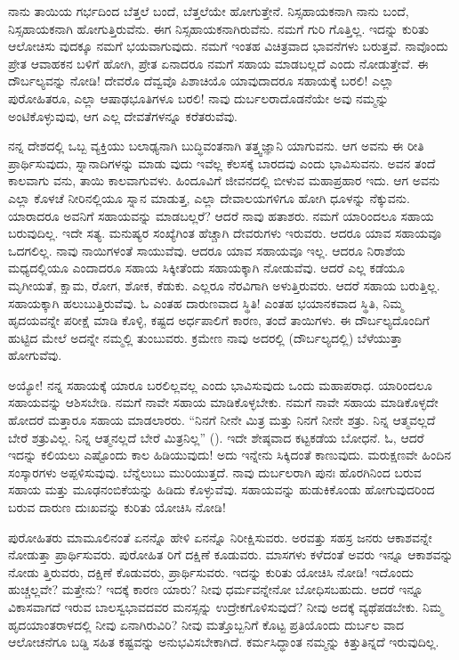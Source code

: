 ನಾನು ತಾಯಿಯ ಗರ್ಭದಿಂದ ಬೆತ್ತಲೆ ಬಂದೆ, ಬೆತ್ತಲೆಯೇ ಹೋಗುತ್ತೇನೆ. ನಿಸ್ಸಹಾಯಕನಾಗಿ ನಾನು ಬಂದೆ, ನಿಸ್ಸಹಾಯಕನಾಗಿ ಹೋಗುತ್ತಿರುವೆನು. ಈಗ ನಿಸ್ಸಹಾಯಕನಾಗಿರುವೆನು. ನಮಗೆ ಗುರಿ ಗೊತ್ತಿಲ್ಲ. ಇದನ್ನು ಕುರಿತು ಆಲೋಚಿಸು ವುದಕ್ಕೂ ನಮಗೆ ಭಯವಾಗುವುದು. ನಮಗೆ ಇಂತಹ ವಿಚಿತ್ರವಾದ ಭಾವನೆಗಳು ಬರುತ್ತವೆ. ನಾವೊಂದು ಪ್ರೇತ ಆವಾಹಕನ ಬಳಿಗೆ ಹೋಗಿ, ಪ್ರೇತ ಏನಾದರೂ ನಮಗೆ ಸಹಾಯ ಮಾಡಬಲ್ಲದೆ ಎಂದು ನೋಡುತ್ತೇವೆ. ಈ ದೌರ್ಬಲ್ಯವನ್ನು ನೋಡಿ! ದೇವರೊ ದೆವ್ವವೊ ಪಿಶಾಚಿಯೊ ಯಾವುದಾದರೂ ಸಹಾಯಕ್ಕೆ ಬರಲಿ! ಎಲ್ಲಾ ಪುರೋಹಿತರೂ, ಎಲ್ಲಾ ಆಷಾಢಭೂತಿಗಳೂ ಬರಲಿ! ನಾವು ದುರ್ಬಲರಾದೊಡನೆಯೇ ಅವು ನಮ್ಮನ್ನು ಅಂಟಿಕೊಳ್ಳುವುವು, ಆಗ ಎಲ್ಲ ದೇವತೆಗಳನ್ನೂ ಕರೆತರುವೆವು.

ನನ್ನ ದೇಶದಲ್ಲಿ ಒಬ್ಬ ವ್ಯಕ್ತಿಯು ಬಲಾಢ್ಯನಾಗಿ ಬುದ್ಧಿವಂತನಾಗಿ ತತ್ತ್ವಜ್ಞಾನಿ ಯಾಗುವನು. ಆಗ ಅವನು ಈ ರೀತಿ ಪ್ರಾರ್ಥಿಸುವುದು, ಸ್ನಾನಾದಿಗಳನ್ನು ಮಾಡು ವುದು ಇವೆಲ್ಲ ಕೆಲಸಕ್ಕೆ ಬಾರದವು ಎಂದು ಭಾವಿಸುವನು. ಅವನ ತಂದೆ ಕಾಲವಾಗು ವನು, ತಾಯಿ ಕಾಲವಾಗುವಳು. ಹಿಂದೂವಿಗೆ ಜೀವನದಲ್ಲಿ ಬೀಳುವ ಮಹಾಪ್ರಹಾರ ಇದು. ಆಗ ಅವನು ಎಲ್ಲಾ ಕೊಳಚೆ ನೀರಿನಲ್ಲಿಯೂ ಸ್ನಾನ ಮಾಡುತ್ತ, ಎಲ್ಲಾ ದೇವಾಲಯಗಳಿಗೂ ಹೋಗಿ ಧೂಳನ್ನು ನೆಕ್ಕುವನು. ಯಾರಾದರೂ ಅವನಿಗೆ ಸಹಾಯವನ್ನು ಮಾಡಬಲ್ಲರೆ? ಆದರೆ ನಾವು ಹತಾಶರು. ನಮಗೆ ಯಾರಿಂದಲೂ ಸಹಾಯ ಬರುವುದಿಲ್ಲ. ಇದೇ ಸತ್ಯ. ಮನುಷ್ಯರ ಸಂಖ್ಯೆಗಿಂತ ಹೆಚ್ಚಾಗಿ ದೇವರುಗಳು ಇರುವರು. ಆದರೂ ಯಾವ ಸಹಾಯವೂ ಒದಗಲಿಲ್ಲ. ನಾವು ನಾಯಿಗಳಂತೆ ಸಾಯುವೆವು. ಆದರೂ ಯಾವ ಸಹಾಯವೂ ಇಲ್ಲ. ಆದರೂ ನಿರಾಶೆಯ ಮಧ್ಯದಲ್ಲಿಯೂ ಎಂದಾದರೂ ಸಹಾಯ ಸಿಕ್ಕೀತೆಂದು ಸಹಾಯಕ್ಕಾಗಿ ನೋಡುವೆವು. ಆದರೆ ಎಲ್ಲ ಕಡೆಯೂ ಮೃಗೀಯತೆ, ಕ್ಷಾಮ, ರೋಗ, ಶೋಕ, ಕೆಡುಕು. ಎಲ್ಲರೂ ನೆರವಿಗಾಗಿ ಅಳುತ್ತಿರುವರು. ಆದರೆ ಸಹಾಯ ಬರುತ್ತಿಲ್ಲ. ಸಹಾಯಕ್ಕಾಗಿ ಹಲುಬುತ್ತಿರುವೆವು. ಓ ಎಂತಹ ದಾರುಣವಾದ ಸ್ಥಿತಿ! ಎಂತಹ ಭಯಾನಕವಾದ ಸ್ಥಿತಿ, ನಿಮ್ಮ ಹೃದಯವನ್ನೇ ಪರೀಕ್ಷೆ ಮಾಡಿ ಕೊಳ್ಳಿ, ಕಷ್ಟದ ಅರ್ಧಪಾಲಿಗೆ ಕಾರಣ, ತಂದೆ ತಾಯಿಗಳು. ಈ ದೌರ್ಬಲ್ಯದೊಂದಿಗೆ ಹುಟ್ಟಿದ ಮೇಲೆ ಅದನ್ನೇ ನಮ್ಮಲ್ಲಿ ತುಂಬುವರು. ಕ್ರಮೇಣ ನಾವು ಅದರಲ್ಲಿ (ದೌರ್ಬಲ್ಯದಲ್ಲಿ) ಬೆಳೆಯುತ್ತಾ ಹೋಗುವೆವು.

ಅಯ್ಯೋ! ನನ್ನ ಸಹಾಯಕ್ಕೆ ಯಾರೂ ಬರಲಿಲ್ಲವಲ್ಲ ಎಂದು ಭಾವಿಸುವುದು ಒಂದು ಮಹಾಪರಾಧ. ಯಾರಿಂದಲೂ ಸಹಾಯವನ್ನು ಆಶಿಸಬೇಡಿ. ನಮಗೆ ನಾವೇ ಸಹಾಯ ಮಾಡಿಕೊಳ್ಳಬೇಕು. ನಮಗೆ ನಾವೇ ಸಹಾಯ ಮಾಡಿಕೊಳ್ಳದೇ ಹೋದರೆ ಮತ್ತಾರೂ ಸಹಾಯ ಮಾಡಲಾರರು. “ನಿನಗೆ ನೀನೇ ಮಿತ್ರ ಮತ್ತು ನಿನಗೆ ನೀನೇ ಶತ್ರು. ನಿನ್ನ ಆತ್ಮವಲ್ಲದೆ ಬೇರೆ ಶತ್ರುವಿಲ್ಲ. ನಿನ್ನ ಆತ್ಮನಲ್ಲದೆ ಬೇರೆ ಮಿತ್ರನಿಲ್ಲ” (). ಇದೇ ಶೇಷ್ಠವಾದ ಕಟ್ಟಕಡೆಯ ಬೋಧನೆ. ಓ, ಆದರೆ ಇದನ್ನು ಕಲಿಯಲು ಎಷ್ಟೊಂದು ಕಾಲ ಹಿಡಿಯುವುದು! ಅದು ಇನ್ನೇನು ಸಿಕ್ಕಿದಂತೆ ಕಾಣುವುದು. ಮರುಕ್ಷಣವೇ ಹಿಂದಿನ ಸಂಸ್ಕಾರಗಳು ಅಪ್ಪಳಿಸುವುವು. ಬೆನ್ನೆಲುಬು ಮುರಿಯುತ್ತದೆ. ನಾವು ದುರ್ಬಲರಾಗಿ ಪುನಃ ಹೊರಗಿನಿಂದ ಬರುವ ಸಹಾಯ ಮತ್ತು ಮೂಢನಂಬಿಕೆಯನ್ನು ಹಿಡಿದು ಕೊಳ್ಳುವೆವು. ಸಹಾಯವನ್ನು ಹುಡುಕಿಕೊಂಡು ಹೋಗುವುದರಿಂದ ಬರುವ ದಾರುಣ ದುಃಖವನ್ನು ಕುರಿತು ಯೋಚಿಸಿ ನೋಡಿ!

ಪುರೋಹಿತರು ಮಾಮೂಲಿನಂತೆ ಏನನ್ನೊ ಹೇಳಿ ಏನನ್ನೊ ನಿರೀಕ್ಷಿಸುವರು. ಅರವತ್ತು ಸಹಸ್ರ ಜನರು ಆಕಾಶವನ್ನೇ ನೋಡುತ್ತಾ ಪ್ರಾರ್ಥಿಸುವರು. ಪುರೋಹಿತ ರಿಗೆ ದಕ್ಷಿಣೆ ಕೂಡುವರು. ಮಾಸಗಳು ಕಳೆದಂತೆ ಅವರು ಇನ್ನೂ ಆಕಾಶವನ್ನು ನೋಡು ತ್ತಿರುವರು, ದಕ್ಷಿಣೆ ಕೊಡುವರು, ಪ್ರಾರ್ಥಿಸುವರು. ಇದನ್ನು ಕುರಿತು ಯೋಚಿಸಿ ನೋಡಿ! ಇದೊಂದು ಹುಚ್ಚಲ್ಲವೇ? ಮತ್ತೇನು? ಇದಕ್ಕೆ ಕಾರಣ ಯಾರು? ನೀವು ಧರ್ಮವನ್ನೇನೋ ಬೋಧಿಸಬಹುದು. ಆದರೆ ಇನ್ನೂ ವಿಕಾಸವಾಗದೆ ಇರುವ ಬಾಲಸ್ವಭಾವದವರ ಮನಸ್ಸನ್ನು ಉದ್ರೇಕಗೊಳಿಸುವುದೆ? ನೀವು ಅದಕ್ಕೆ ವ್ಯಥೆಪಡಬೇಕು. ನಿಮ್ಮ ಹೃದಯಾಂತರಾಳದಲ್ಲಿ ನೀವು ಏನಾಗಿರುವಿರಿ? ನೀವು ಮತ್ತೊಬ್ಬನಿಗೆ ಕೊಟ್ಟ ಪ್ರತಿಯೊಂದು ದುರ್ಬಲ ವಾದ ಆಲೋಚನೆಗೂ ಬಡ್ಡಿ ಸಹಿತ ಕಷ್ಟವನ್ನು ಅನುಭವಿಸಬೇಕಾಗಿದೆ. ಕರ್ಮಸಿದ್ಧಾಂತ ನಮ್ಮನ್ನು ಕಿತ್ತುತಿನ್ನದೆ ಇರುವುದಿಲ್ಲ.

